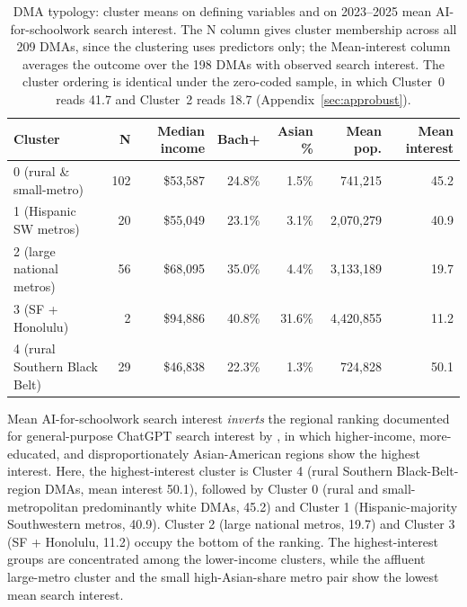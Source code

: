 \documentclass[11pt]{article}
\begin{document}
\begin{table}[!htbp]
\centering
\footnotesize
\setlength{\tabcolsep}{4pt}
\begin{tabular}{lrrrrrr}
\toprule
Cluster & N & Median income & Bach+ & Asian \% & Mean pop. & Mean interest \\
\midrule
0 (rural \& small-metro)         & 102 & \$53{,}587 & 24.8\% & \phantom{0}1.5\% & \phantom{0,}741{,}215 & 45.2 \\
1 (Hispanic SW metros)           & \phantom{0}20 & \$55{,}049 & 23.1\% & \phantom{0}3.1\% & 2{,}070{,}279 & 40.9 \\
2 (large national metros)        & \phantom{0}56 & \$68{,}095 & 35.0\% & \phantom{0}4.4\% & 3{,}133{,}189 & 19.7 \\
3 (SF + Honolulu)                & \phantom{00}2 & \$94{,}886 & 40.8\% & 31.6\% & 4{,}420{,}855 & 11.2 \\
4 (rural Southern Black Belt)    & \phantom{0}29 & \$46{,}838 & 22.3\% & \phantom{0}1.3\% & \phantom{0,}724{,}828 & 50.1 \\
\bottomrule
\end{tabular}
\caption{DMA typology: cluster means on defining variables and on 2023--2025 mean AI-for-schoolwork search interest. The N column gives cluster membership across all 209 DMAs, since the clustering uses predictors only; the Mean-interest column averages the outcome over the 198 DMAs with observed search interest. The cluster ordering is identical under the zero-coded sample, in which Cluster~0 reads 41.7 and Cluster~2 reads 18.7 (Appendix~\ref{sec:approbust}).}
\label{tab:clusters}
\end{table}

Mean AI-for-schoolwork search interest \emph{inverts} the regional ranking documented for general-purpose ChatGPT search interest by \citet{daepp2025}, in which higher-income, more-educated, and disproportionately Asian-American regions show the highest interest. Here, the highest-interest cluster is Cluster 4 (rural Southern Black-Belt-region DMAs, mean interest 50.1), followed by Cluster 0 (rural and small-metropolitan predominantly white DMAs, 45.2) and Cluster 1 (Hispanic-majority Southwestern metros, 40.9). Cluster 2 (large national metros, 19.7) and Cluster 3 (SF + Honolulu, 11.2) occupy the bottom of the ranking. The highest-interest groups are concentrated among the lower-income clusters, while the affluent large-metro cluster and the small high-Asian-share metro pair show the lowest mean search interest.
\end{document}
